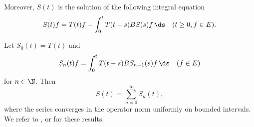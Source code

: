 Moreover, $S(t)$ is the solution of the following integral equation
\begin{equation}\label{eq:a2-1.9}
    S(t)f = T(t)f + \int_{0}^{t} T(t-s)BS(s)f\, \ds \quad (t \geq 0, f \in E).
\end{equation}

Let $S_{0}(t) = T(t)$ and
\begin{equation}\label{eq:a2-1.10}
    S_{n}(t)f = \int_{0}^{t} T(t-s)BS_{n-1}(s)f\, \ds \quad (f \in E)
\end{equation}
for $n \in \N$. Then
\begin{equation}\label{eq:a2-1.11}
    S(t) = \sum_{n=0}^{\infty} S_{n}(t),
\end{equation}
where the series converges in the operator norm uniformly on bounded intervals.
We refer to \textcite[III.1]{davies:1980}, \textcite[I.6]{goldstein:1985a} or \textcite[Chapter 3]{pazy:1983} for these results.

